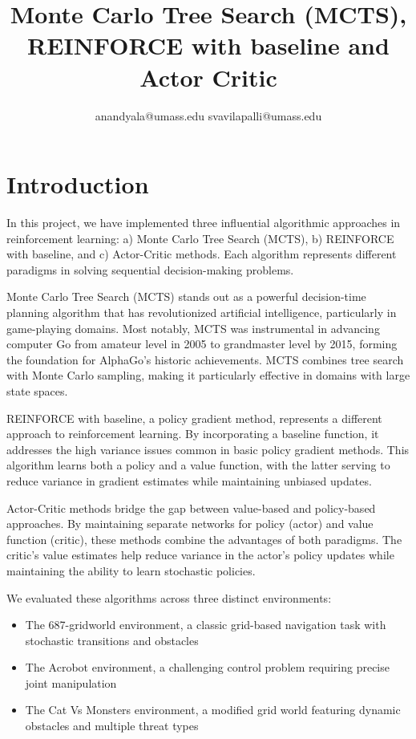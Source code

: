 \documentclass{article}
\title{Monte Carlo Tree Search (MCTS), REINFORCE with baseline and Actor Critic}
\author{anandyala@umass.edu svavilapalli@umass.edu }
\begin{document}
\maketitle
\thispagestyle{fancy}

\section{Introduction}

In this project, we have implemented three influential algorithmic approaches in reinforcement learning: a) Monte Carlo Tree Search (MCTS), b) REINFORCE with baseline, and c) Actor-Critic methods. 
Each algorithm represents different paradigms in solving sequential decision-making problems.

Monte Carlo Tree Search (MCTS) stands out as a powerful decision-time planning algorithm that has revolutionized artificial intelligence, particularly in game-playing domains. 
Most notably, MCTS was instrumental in advancing computer Go from amateur level in 2005 to grandmaster level by 2015, forming the foundation for AlphaGo's historic achievements.
MCTS combines tree search with Monte Carlo sampling, making it particularly effective in domains with large state spaces.

REINFORCE with baseline, a policy gradient method, represents a different approach to reinforcement learning. 
By incorporating a baseline function, it addresses the high variance issues common in basic policy gradient methods. 
This algorithm learns both a policy and a value function, with the latter serving to reduce variance in gradient estimates while maintaining unbiased updates.

Actor-Critic methods bridge the gap between value-based and policy-based approaches. 
By maintaining separate networks for policy (actor) and value function (critic), these methods combine the advantages of both paradigms. 
The critic's value estimates help reduce variance in the actor's policy updates while maintaining the ability to learn stochastic policies.

We evaluated these algorithms across three distinct environments:
\begin{itemize}
    \item The 687-gridworld environment, a classic grid-based navigation task with stochastic transitions and obstacles
    \item The Acrobot environment, a challenging control problem requiring precise joint manipulation
    \item The Cat Vs Monsters environment, a modified grid world featuring dynamic obstacles and multiple threat types
\end{itemize}
\end{document}
